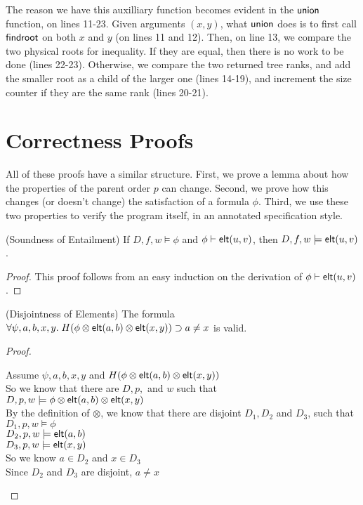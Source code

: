The reason we have this auxilliary function becomes evident in the
$\mathsf{union}$ function, on lines 11-23. Given arguments $(x,y)$, what
$\mathsf{union}$ does is to first call $\mathsf{findroot}$ on both $x$ and $y$ (on
lines 11 and 12). Then, on line 13, we compare the two physical roots
for inequality. If they are equal, then there is no work to be done
(lines 22-23). Otherwise, we compare the two returned tree ranks, and
add the smaller root as a child of the larger one (lines 14-19), and
increment the size counter if they are the same rank (lines 20-21).

\section{Correctness Proofs}

All of these proofs have a similar structure. First, we prove a lemma about how 
the properties of the parent order $p$ can change. Second, we prove how this changes
(or doesn't change) the satisfaction of a formula $\phi$. Third, we use these
two properties to verify the program itself, in an annotated specification style.




\begin{lemma}{(Soundness of Entailment)}
  If $D, f, w \models \phi$ and ${\phi} \vdash \mathsf{elt}({u}, {v})$, then $D, f, w \models \mathsf{elt}({u}, {v})$. 
\end{lemma}

\begin{proof}
  This proof follows from an easy induction on the derivation of ${\phi} \vdash \mathsf{elt}({u}, {v})$. 
\end{proof}

\begin{lemma}{(Disjointness of Elements)}
  The formula $\forall \psi,a,b,x,y.\;H(\phi \otimes \mathsf{elt}({a}, {b}) \otimes \mathsf{elt}({x}, {y})) \supset a \not= x$
  is valid.   
\end{lemma}
\begin{proof}
  \begin{tabbedproof}
    \oo Assume $\psi,a,b,x,y$ and $H(\phi \otimes \mathsf{elt}({a}, {b}) \otimes \mathsf{elt}({x}, {y}))$ \\
    \ooo So we know that there are $D, p,$ and $w$ such that $D, p, w \models \phi \otimes \mathsf{elt}({a}, {b}) \otimes \mathsf{elt}({x}, {y})$ \\
    \ooo By the definition of $\otimes$, we know that there are disjoint $D_1, D_2$ and $D_3$, such that\\
    \ooox $D_1, p, w \models \phi$ \\
    \ooox $D_2, p, w \models \mathsf{elt}({a}, {b})$ \\
    \ooox $D_3, p, w \models \mathsf{elt}({x}, {y})$ \\
    \ooo So we know $a \in D_2$ and $x \in D_3$ \\
    \ooo Since $D_2$ and $D_3$ are disjoint, $a \not= x$ 
  \end{tabbedproof}
\end{proof}

